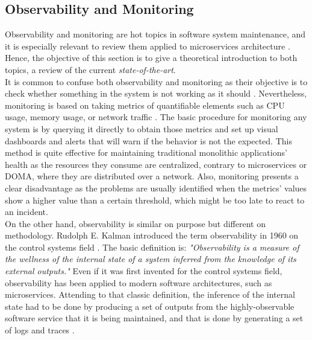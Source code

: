 \documentclass[english, 12pt, a4paper, sci, utf8, a-1b, online]{aaltothesis}
\begin{document}
\subsection{Observability and Monitoring}
\label{sec:observability-monitoring}


%

Observability and monitoring are hot topics in software system maintenance, and it is especially relevant to review them applied to microservices architecture \cite{ObservabilityvsMonitoring}. Hence, the objective of this section is to give a theoretical introduction to both topics, a review of the current \textit{state-of-the-art}.\\

It is common to confuse both observability and monitoring as their objective is to check whether something in the system is not working as it should \cite{ObservabilityvsMonitoring}. Nevertheless, monitoring is based on taking metrics of quantifiable elements such as CPU usage, memory usage, or network traffic \cite{MonitoringIEEE}. The basic procedure for monitoring any system is by querying it directly to obtain those metrics and set up visual dashboards and alerts that will warn if the behavior is not the expected. This method is quite effective for maintaining traditional monolithic applications' health as the resources they consume are centralized, contrary to microservices or DOMA, where they are distributed over a network. Also, monitoring presents a clear disadvantage as the problems are usually identified when the metrics' values show a higher value than a certain threshold, which might be too late to react to an incident.\\

On the other hand, observability is similar on purpose but different on methodology. Rudolph E. Kalman introduced the term observability in 1960 on the control systems field \cite{kalman1960general}. The basic definition is: \textit{"Observability is a measure of the wellness of the internal state of a system inferred from the knowledge of its external outputs."} Even if it was first invented for the control systems field, observability has been applied to modern software architectures, such as microservices. Attending to that classic definition, the inference of the internal state had to be done by producing a set of outputs from the highly-observable software service that it is being maintained, and that is done by generating a set of logs and traces \cite{picoreti2018multilevel}.\\
\end{document}
